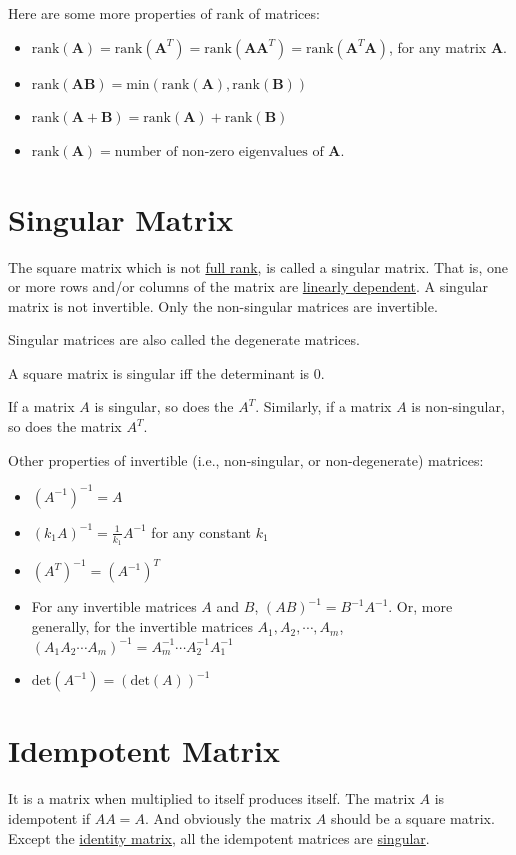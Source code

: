 \documentclass[conference,final,11pt,technote,onecolumn]{IEEEtran}\usepackage[]{graphicx}\usepackage[]{color}
\begin{document}
Here are some more properties of rank of matrices:
\begin{itemize}
	\item $\text{rank}(\mathbf{A}) = \text{rank}(\mathbf{A}^T) = \text{rank}(\mathbf{A}\mathbf{A}^T) = \text{rank}(\mathbf{A}^T\mathbf{A})$, for any matrix $\mathbf{A}$.
	\item $\text{rank}(\mathbf{AB}) = \text{min}(\text{rank}(\mathbf{A}),\text{rank}(\mathbf{B}))$
	\item $\text{rank}(\mathbf{A}+\mathbf{B}) = \text{rank}(\mathbf{A}) + \text{rank}(\mathbf{B})$
	\item $\text{rank}(\mathbf{A}) = \text{number of non-zero eigenvalues of }\mathbf{A}$.
\end{itemize}

	\section{Singular Matrix}
	\label{term:singular_matrix}
The square matrix which is not \hyperref[term:rank_of_a_matrix]{full rank}, is called a singular matrix. That is, one or more rows and/or columns of the matrix are \hyperref[term:linearly_independent_vectors]{linearly dependent}. A singular matrix is not invertible. Only the non-singular matrices are invertible.

Singular matrices are also called the degenerate matrices.

A square matrix is singular iff the determinant is 0.

If a matrix $A$ is singular, so does the $A^T$. Similarly, if a matrix $A$ is non-singular, so does the matrix $A^T$.

Other properties of invertible (i.e., non-singular, or non-degenerate) matrices:
\begin{itemize}
\item $(A^{-1})^{-1} = A$
\item $(k_1A)^{-1} = \frac{1}{k_1}A^{-1}$ for any constant $k_1$
\item $(A^T)^{-1} = (A^{-1})^T$
\item For any invertible matrices $A$ and $B$, $(AB)^{-1} = B^{-1}A^{-1}$. Or, more generally, for the invertible matrices $A_1, A_2, \cdots, A_m$, $(A_1A_2\cdots A_m)^{-1} = A^{-1}_m\cdots A^{-1}_2A^{-1}_1$
\item $\text{det}(A^{-1}) = (\text{det}(A))^{-1}$
\end{itemize}
	\section{Idempotent Matrix}
	\label{term:idempotent_matrix}
	It is a matrix when multiplied to itself produces itself\cite{chiang2005fundamental}. The matrix $A$ is idempotent if $AA=A$. And obviously the matrix $A$ should be a square matrix. Except the \hyperref[term:identity_matrix]{identity matrix}, all the idempotent matrices are \hyperref[term:singular_matrix]{singular}. 
	
\end{document}
